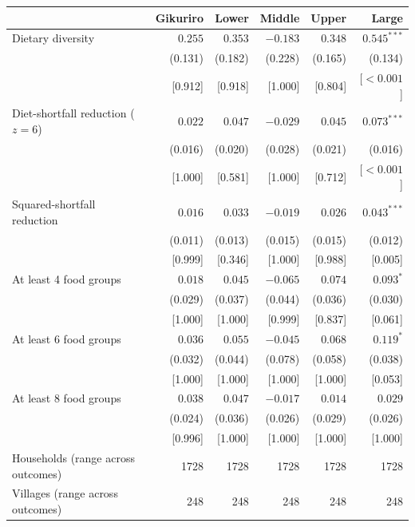 \begin{tabular}{lrrrrr}
\toprule
 & Gikuriro & Lower & Middle & Upper & Large \\
\midrule
Dietary diversity & $0.255$ & $0.353$ & $-0.183$ & $0.348$ & $0.545^{***}$ \\
 & (0.131) & (0.182) & (0.228) & (0.165) & (0.134) \\
 & [0.912] & [0.918] & [1.000] & [0.804] & [$<0.001$] \\
Diet-shortfall reduction ($z=6$) & $0.022$ & $0.047$ & $-0.029$ & $0.045$ & $0.073^{***}$ \\
 & (0.016) & (0.020) & (0.028) & (0.021) & (0.016) \\
 & [1.000] & [0.581] & [1.000] & [0.712] & [$<0.001$] \\
Squared-shortfall reduction & $0.016$ & $0.033$ & $-0.019$ & $0.026$ & $0.043^{***}$ \\
 & (0.011) & (0.013) & (0.015) & (0.015) & (0.012) \\
 & [0.999] & [0.346] & [1.000] & [0.988] & [0.005] \\
At least 4 food groups & $0.018$ & $0.045$ & $-0.065$ & $0.074$ & $0.093^{*}$ \\
 & (0.029) & (0.037) & (0.044) & (0.036) & (0.030) \\
 & [1.000] & [1.000] & [0.999] & [0.837] & [0.061] \\
At least 6 food groups & $0.036$ & $0.055$ & $-0.045$ & $0.068$ & $0.119^{*}$ \\
 & (0.032) & (0.044) & (0.078) & (0.058) & (0.038) \\
 & [1.000] & [1.000] & [1.000] & [1.000] & [0.053] \\
At least 8 food groups & $0.038$ & $0.047$ & $-0.017$ & $0.014$ & $0.029$ \\
 & (0.024) & (0.036) & (0.026) & (0.029) & (0.026) \\
 & [0.996] & [1.000] & [1.000] & [1.000] & [1.000] \\
Households (range across outcomes) & 1728 & 1728 & 1728 & 1728 & 1728 \\
Villages (range across outcomes) & 248 & 248 & 248 & 248 & 248 \\
\bottomrule
\end{tabular}
